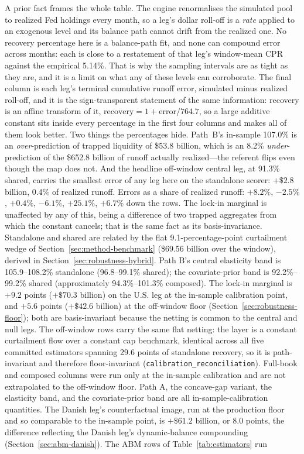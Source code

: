 \documentclass[12pt]{article}
\begin{document}
\begin{table}[H]
\begin{threeparttable}
\begin{tablenotes}[flushleft]
\item A prior fact frames the whole table. The engine renormalises the simulated pool to realized Fed holdings every month, so a leg's dollar roll-off is a \emph{rate} applied to an exogenous level and its balance path cannot drift from the realized one. No recovery percentage here is a balance-path fit, and none can compound error across months: each is close to a restatement of that leg's window-mean CPR against the empirical 5.14\%. That is why the sampling intervals are as tight as they are, and it is a limit on what any of these levels can corroborate. The final column is each leg's terminal cumulative runoff error, simulated minus realized roll-off, and it is the sign-transparent statement of the same information: recovery is an affine transform of it, $\text{recovery} = 1 + \text{error}/764.7$, so a large additive constant sits inside every percentage in the first four columns and makes all of them look better. Two things the percentages hide. Path~B's in-sample 107.0\% is an \emph{over}-prediction of trapped liquidity of \$53.8 billion, which is an 8.2\% \emph{under}-prediction of the \$652.8 billion of runoff actually realized---the referent flips even though the map does not. And the headline off-window central leg, at 91.3\% shared, carries the smallest error of any leg here on the standalone scorer: $+\$2.8$ billion, 0.4\% of realized runoff. Errors as a share of realized runoff: $+8.2\%$, $-2.5\%$, $+0.4\%$, $-6.1\%$, $+25.1\%$, $+6.7\%$ down the rows. The lock-in marginal is unaffected by any of this, being a difference of two trapped aggregates from which the constant cancels; that is the same fact as its basis-invariance. Standalone and shared are related by the flat 9.1-percentage-point curtailment wedge of Section~\ref{sec:method-benchmark} (\$69.56 billion over the window), derived in Section~\ref{sec:robustness-hybrid}. Path B's central elasticity band is 105.9--108.2\% standalone (96.8--99.1\% shared); the covariate-prior band is 92.2\%--99.2\% shared (approximately 94.3\%--101.3\% composed). The lock-in marginal is $+9.2$ points ($+\$70.3$ billion) on the U.S. leg at the in-sample calibration point, and $+5.6$ points ($+\$42.6$ billion) at the off-window floor (Section~\ref{sec:robustness-floor}); both are basis-invariant because the netting is common to the central and null legs. The off-window rows carry the same flat netting: the layer is a constant curtailment flow over a constant cap benchmark, identical across all five committed estimators spanning 29.6 points of standalone recovery, so it is path-invariant and therefore floor-invariant (\texttt{calibration\_reconciliation}). Full-book and composed columns were run only at the in-sample calibration and are not extrapolated to the off-window floor. Path A, the concave-gap variant, the elasticity band, and the covariate-prior band are all in-sample-calibration quantities. The Danish leg's counterfactual image, run at the production floor and so comparable to the in-sample point, is $+\$61.2$ billion, or 8.0 points, the difference reflecting the Danish leg's dynamic-balance compounding (Section~\ref{sec:abm-danish}). The ABM rows of Table~\ref{tab:estimators} run 
\end{tablenotes}
\end{threeparttable}
\end{table}
\end{document}
